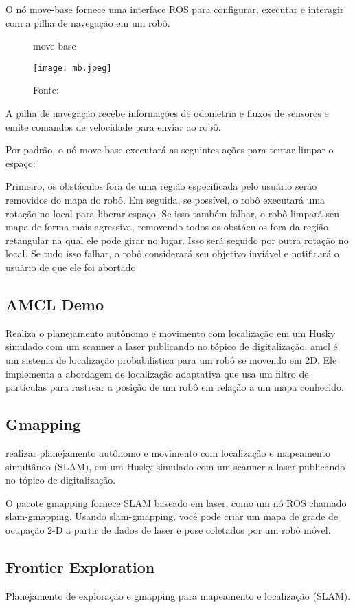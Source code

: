  O nó move-base fornece uma interface ROS para configurar, executar e interagir com a pilha de navegação em um robô.
 \begin{figure} [h!]	
   \centering
   \caption{move base}
   \texttt{[image: mb.jpeg]}
   \caption*{Fonte:}
   \label{fig:movebase}
\end{figure}

A pilha de navegação recebe informações de odometria e fluxos de sensores e emite comandos de velocidade para enviar ao robô.

Por padrão, o nó move-base executará as seguintes ações para tentar limpar o espaço:

Primeiro, os obstáculos fora de uma região especificada pelo usuário serão removidos do mapa do robô. Em seguida, se possível, o robô executará uma rotação no local para liberar espaço. Se isso também falhar, o robô limpará seu mapa de forma mais agressiva, removendo todos os obstáculos fora da região retangular na qual ele pode girar no lugar. Isso será seguido por outra rotação no local. Se tudo isso falhar, o robô considerará seu objetivo inviável e notificará o usuário de que ele foi abortado \cite{WikiROS}

\subsection{AMCL Demo}
Realiza o planejamento autônomo e movimento com localização em um Husky simulado com um scanner a laser publicando no tópico de digitalização.
amcl é um sistema de localização probabilística para um robô se movendo em 2D. Ele implementa a abordagem de localização adaptativa que usa um filtro de partículas para rastrear a posição de um robô em relação a um mapa conhecido. \cite{WikiROS}

\subsection{Gmapping}
realizar planejamento autônomo e movimento com localização e mapeamento simultâneo (SLAM), em um Husky simulado com um scanner a laser publicando no tópico de digitalização.

O pacote gmapping fornece SLAM baseado em laser, como um nó ROS chamado slam-gmapping. Usando slam-gmapping, você pode criar um mapa de grade de ocupação 2-D a partir de dados de laser e pose coletados por um robô móvel.\cite{WikiROS}

\subsection{Frontier Exploration}
Planejamento de exploração e gmapping para mapeamento e localização (SLAM).

